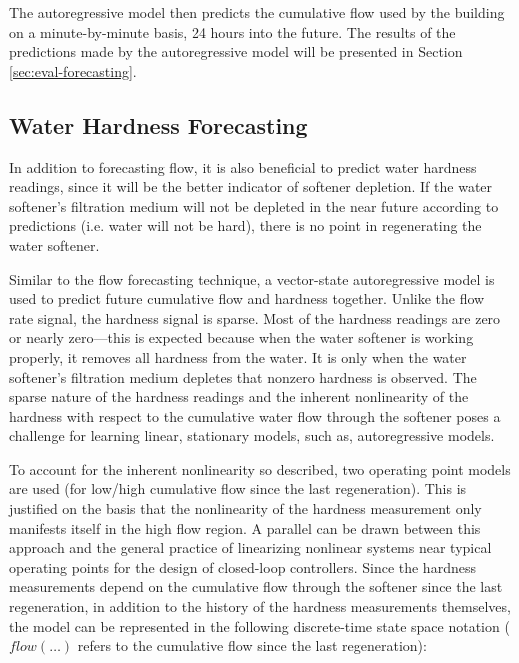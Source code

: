The autoregressive model then predicts the cumulative flow used by the building on a minute-by-minute basis, 24 hours into the future.
 The results of the predictions made by the autoregressive model will be presented in Section \ref{sec:eval-forecasting}.

\subsection{Water Hardness Forecasting}

In addition to forecasting flow, it is also beneficial to predict water hardness readings, since it will be the better indicator of softener depletion.
 If the water softener's filtration medium will not be depleted in the near future according to predictions (i.e. water will not be hard), there is no point in regenerating the water softener.


Similar to the flow forecasting technique, a vector-state autoregressive model is used to predict future cumulative flow and hardness together.
 Unlike the flow rate signal, the hardness signal is sparse.
 Most of the hardness readings are zero or nearly zero---this is expected because when the water softener is working properly, it removes all hardness from the water.
 It is only when the water softener's filtration medium depletes that nonzero hardness is observed.
 The sparse nature of the hardness readings and the inherent nonlinearity of the hardness with respect to the cumulative water flow through the softener poses a challenge for learning linear, stationary models, such as, autoregressive models.


To account for the inherent nonlinearity so described, two operating point models are used (for low/high cumulative flow since the last regeneration).
 This is justified on the basis that the nonlinearity of the hardness measurement only manifests itself in the high flow region.
 A parallel can be drawn between this approach and the general practice of linearizing nonlinear systems near typical operating points for the design of closed-loop controllers.
 Since the hardness measurements depend on the cumulative flow through the softener since the last regeneration, in addition to the history of the hardness measurements themselves, the model can be represented in the following discrete-time state space notation ($flow(\dots)$ refers to the cumulative flow since the last regeneration):

